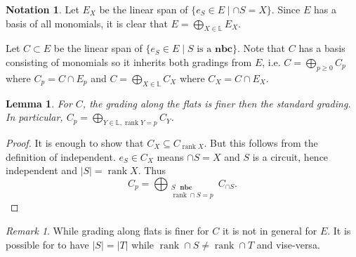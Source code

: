\documentclass[article,twoside]{article}
\newcommand{\BB}[1]{\mathbb{#1}}
\newcommand{\rk}{\operatorname{rank}}
\newcommand{\lattice}{\BB{L}}
\newcommand{\NBC}{$\textbf{nbc}$}
\theoremstyle{plain}
\theoremstyle{plain}
\newtheorem{lemma}[lemma]{Lemma}
\theoremstyle{plain}
\theoremstyle{plain}
\theoremstyle{plain}
\theoremstyle{definition}
\theoremstyle{definition}
\newtheorem{notation}[notation]{Notation}
\theoremstyle{definition}
\theoremstyle{remark}
\theoremstyle{remark}
\newtheorem{remark}[remark]{Remark}
\begin{document}
\begin{notation}
	Let $E_X$ be the linear span of $\{e_S\in E \mid \cap S = X\}$. Since $E$ has a basis of all monomials, it is clear that $E = \bigoplus_{X\in\lattice}E_X$.

	Let $C\subset E$ be the linear span of $\{e_S\in E \mid \text{$S$ is a \NBC}\}$. Note that $C$ has a basis consisting of monomials so it inherits both gradings from $E$, i.e. $C = \bigoplus_{p\geq 0}C_p$ where $C_p = C\cap E_p$ and $C  =\bigoplus_{X\in\lattice}C_X$ where $C_X = C\cap E_X$.
\end{notation}

\begin{lemma}\label{lemma_C_flat_grading}
	For $C$, the grading along the flats is finer then the standard grading. In particular, $C_p = \bigoplus_{Y\in\lattice, \rk Y=p}C_Y$.
\end{lemma}
\begin{proof}
	It is enough to show that $C_X\subseteq C_{\rk X}$. But this follows from the definition of independent. $e_S\in C_X$ means $\cap S=X$ and $S$ is a circuit, hence independent and $|S| = \rk X$. Thus
	$$
		C_p = \bigoplus_{\substack{S\text{ \NBC} \\ \rk\cap S = p}} C_{\cap S}.
	$$
\end{proof}

\begin{remark}
	While grading along flats is finer for $C$ it is not in general for $E$. It is possible for to have $|S|=|T|$ while $\rk\cap S\neq \rk\cap T$ and vise-versa.
\end{remark}
\end{document}
